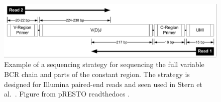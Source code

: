 \begin{figure}
    \centering
    \includegraphics[width=1\textwidth]{figures/Stern2014_ReadConfiguration.pdf}
    \caption{
        \label{fig:UMIread}
        Example of a sequencing strategy for sequencing the full variable BCR chain and parts of the constant region. The strategy is designed for Illumina paired-end reads and seen used in Stern et al.\ \cite{stern2014b}. Figure from pRESTO readthedocs \cite{vander2014presto}.
    }
\end{figure}

